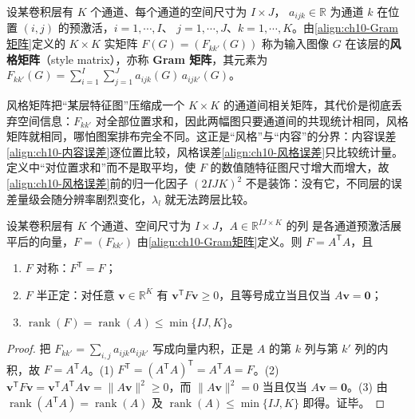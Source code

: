 \documentclass[../../main.tex]{subfiles}
\begin{document}
\begin{definition}\label{definition:ch10-Gram矩阵}
设某卷积层有 $K$ 个通道、每个通道的空间尺寸为 $I\times J$，
$a_{ijk}\in\mathbb{R}$ 为通道 $k$ 在位置 $(i,j)$ 的预激活，$i=1,\cdots,I$、
$j=1,\cdots,J$、$k=1,\cdots,K$。由\eqref{align:ch10-Gram矩阵}定义的 $K\times K$ 实矩阵
$F(G)=(F_{kk'}(G))$ 称为输入图像 $G$ 在该层的\textbf{风格矩阵}（style matrix），亦称
\textbf{Gram 矩阵}，其元素为
$F_{kk'}(G)=\sum_{i=1}^{I}\sum_{j=1}^{J}a_{ijk}(G)\,a_{ijk'}(G)$。
\end{definition}

\begin{remark}
风格矩阵把“某层特征图”压缩成一个 $K\times K$ 的通道间相关矩阵，其代价是彻底丢弃空间信息：$F_{kk'}$ 对全部位置求和，因此两幅图只要通道间的共现统计相同，风格矩阵就相同，哪怕图案排布完全不同。这正是“风格”与“内容”的分界：内容误差\eqref{align:ch10-内容误差}逐位置比较，风格误差\eqref{align:ch10-风格误差}只比较统计量。定义中“对位置求和”而不是取平均，使 $F$ 的数值随特征图尺寸增大而增大，故\eqref{align:ch10-风格误差}前的归一化因子 $(2IJK)^2$ 不是装饰：没有它，不同层的误差量级会随分辨率剧烈变化，$\lambda_l$ 就无法跨层比较。
\end{remark}

\begin{proposition}\label{proposition:ch10-Gram矩阵性质}
设某卷积层有 $K$ 个通道、空间尺寸为 $I\times J$，$A\in\mathbb{R}^{IJ\times K}$ 的列
是各通道预激活展平后的向量，$F=(F_{kk'})$ 由\eqref{align:ch10-Gram矩阵}定义。则
$F=A^{\mathsf{T}}A$，且
\begin{enumerate}
  \item $F$ 对称：$F^{\mathsf{T}}=F$；
  \item $F$ 半正定：对任意 $\mathbf{v}\in\mathbb{R}^{K}$ 有 $\mathbf{v}^{\mathsf{T}}F\mathbf{v}\geqslant0$，且等号成立当且仅当 $A\mathbf{v}=\mathbf{0}$；
  \item $\operatorname{rank}(F)=\operatorname{rank}(A)\leqslant\min\{IJ,K\}$。
\end{enumerate}
\end{proposition}
\begin{proof}
把 $F_{kk'}=\sum_{i,j}a_{ijk}a_{ijk'}$ 写成向量内积，正是 $A$ 的第 $k$ 列与第 $k'$ 列的内积，故 $F=A^{\mathsf{T}}A$。(1) $F^{\mathsf{T}}=(A^{\mathsf{T}}A)^{\mathsf{T}}=A^{\mathsf{T}}A=F$。(2) $\mathbf{v}^{\mathsf{T}}F\mathbf{v}=\mathbf{v}^{\mathsf{T}}A^{\mathsf{T}}A\mathbf{v}=\|A\mathbf{v}\|^2\geqslant0$，而 $\|A\mathbf{v}\|^2=0$ 当且仅当 $A\mathbf{v}=\mathbf{0}$。(3) 由 $\operatorname{rank}(A^{\mathsf{T}}A)=\operatorname{rank}(A)$ 及 $\operatorname{rank}(A)\leqslant\min\{IJ,K\}$ 即得。证毕。
\end{proof}
\end{document}
